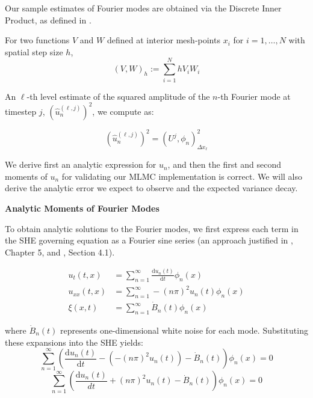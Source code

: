 Our sample estimates of Fourier modes are obtained via the Discrete Inner Product,
as defined in \cite{suli2025nspdes}.

\begin{definition}
    \label{def:discrete_inner_product}
    For two functions $V$ and $W$ defined at interior mesh-points 
    $x_i$ for $i = 1, \dots, N$ with spatial step size $h$,
    \begin{equation*}
        (V,W)_h := \sum_{i = 1}^{N} h V_i W_i
    \end{equation*}
\end{definition}

An $\ell$-th level estimate of the squared amplitude of the $n$-th Fourier mode
at timestep $j$, $(\hat{u}_n^{(\ell,j)})^2$, we compute as:

\begin{equation*}
    (\hat{u}_n^{(\ell, j)})^2 = \left(U^j, \phi_n\right)_{\Delta x_\ell}^2
\end{equation*}

We derive first an analytic expression for $u_n$, 
and then the first and second moments of $u_n$ for validating our 
MLMC implementation is correct. We will also derive the 
analytic error we expect to observe and 
the expected variance decay. 
\newline

\textbf{Analytic Moments of Fourier Modes}

To obtain analytic solutions to the Fourier modes, we first express each term 
in the SHE governing equation as a Fourier sine series (an approach justified 
in \cite{strauss2007partial}, Chapter 5, and \cite{da2014stochastic}, Section 4.1).

$$
\begin{aligned} 
    u_t(t,x) &= \sum_{n=1}^\infty \frac{\mathrm{d}u_n(t)}{\mathrm{d}t}\phi_n(x) \\ 
    u_{xx}(t,x) &= \sum_{n=1}^\infty -(n\pi)^2 u_n(t)\phi_n(x) \\ 
    \xi(x,t) &= \sum_{n=1}^\infty \dot{B}_n(t) \phi_n(x) 
\end{aligned}
$$

where $\dot{B}_n(t)$ represents one-dimensional white noise for each mode.
Substituting these expansions into the SHE yields:
$$\sum_{n=1}^\infty \left( \frac{\mathrm{d}u_n(t)}{\mathrm{d}t} - (-(n\pi)^2 u_n(t)) 
- \dot{B}_n(t) \right) \phi_n(x) = 0$$ $$\sum_{n=1}^\infty \left( \frac{\mathrm{d}u_n(t)}{dt}
 + (n\pi)^2 u_n(t) - \dot{B}_n(t) \right) \phi_n(x) = 0
 $$

